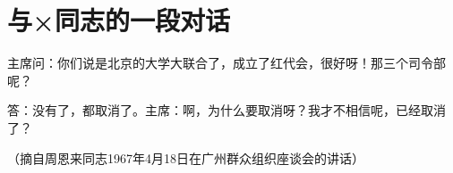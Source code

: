 \section[与×同志的一段对话（一九六七年四月）]{与×同志的一段对话}


主席问：你们说是北京的大学大联合了，成立了红代会，很好呀！那三个司令部呢？

答：没有了，都取消了。主席：啊，为什么要取消呀？我才不相信呢，已经取消了？

{\raggedleft （摘自周恩来同志1967年4月18日在广州群众组织座谈会的讲话）\par}


